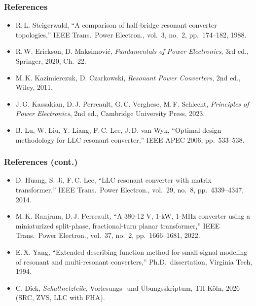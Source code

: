 \begin{frame}
	\frametitle{References}
	\scriptsize
	\begin{itemize}
		\item R.\,L. Steigerwald, ``A comparison of half-bridge resonant converter topologies,'' IEEE Trans.\ Power Electron., vol.\ 3, no.\ 2, pp.\ 174--182, 1988.
		\item R.\,W. Erickson, D. Maksimovi\'c, \textit{Fundamentals of Power Electronics}, 3rd ed., Springer, 2020, Ch.\ 22.
		\item M.\,K. Kazimierczuk, D. Czarkowski, \textit{Resonant Power Converters}, 2nd ed., Wiley, 2011.
		\item J.\,G. Kassakian, D.\,J. Perreault, G.\,C. Verghese, M.\,F. Schlecht, \textit{Principles of Power Electronics}, 2nd ed., Cambridge University Press, 2023.
		\item B. Lu, W. Liu, Y. Liang, F.\,C. Lee, J.\,D. van Wyk, ``Optimal design methodology for LLC resonant converter,'' IEEE APEC 2006, pp.\ 533--538.
	\end{itemize}
\end{frame}

\begin{frame}
	\frametitle{References (cont.)}
	\scriptsize
	\begin{itemize}
		\item D. Huang, S. Ji, F.\,C. Lee, ``LLC resonant converter with matrix transformer,'' IEEE Trans.\ Power Electron., vol.\ 29, no.\ 8, pp.\ 4339--4347, 2014.
		\item M.\,K. Ranjram, D.\,J. Perreault, ``A 380-12 V, 1-kW, 1-MHz converter using a miniaturized split-phase, fractional-turn planar transformer,'' IEEE Trans.\ Power Electron., vol.\ 37, no.\ 2, pp.\ 1666--1681, 2022.
		\item E.\,X. Yang, ``Extended describing function method for small-signal modeling of resonant and multi-resonant converters,'' Ph.D.\ dissertation, Virginia Tech, 1994.
		\item C. Dick, \textit{Schaltnetzteile}, Vorlesungs- und \"Ubungsskriptum, TH K\"oln, 2026 (SRC, ZVS, LLC with FHA).
	\end{itemize}
\end{frame}
